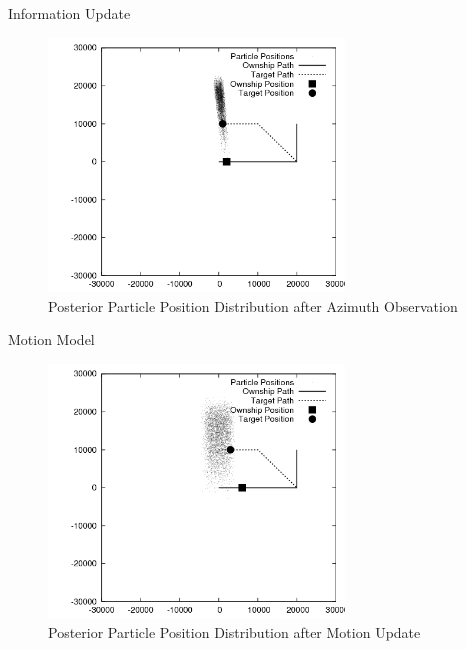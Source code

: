 \documentclass{beamer}
\begin{document}
\begin{frame}{Information Update}

\begin{figure}
\centering
\includegraphics[width=0.7\textwidth]{data/particles_azimuth_obs.png}
\caption{Posterior Particle Position Distribution after Azimuth Observation}
\end{figure}

\end{frame}




\begin{frame}{Motion Model}

\begin{figure}
\centering
\includegraphics[width=0.7\textwidth]{data/particles_motion.png}
\caption{Posterior Particle Position Distribution after Motion Update}
\end{figure}

\end{frame}
\end{document}
